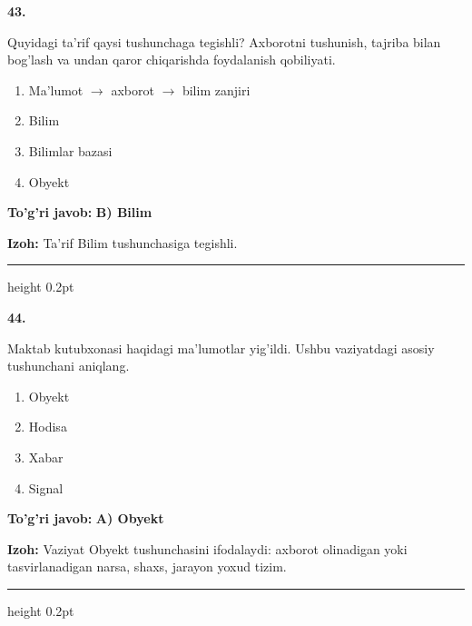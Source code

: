 \documentclass[10pt,a4paper,oneside]{article}
\begin{document}
\noindent\textbf{\color{ink}43.}
\par
Quyidagi ta'rif qaysi tushunchaga tegishli? Axborotni tushunish, tajriba bilan bog'lash va undan qaror chiqarishda foydalanish qobiliyati.
\begin{enumerate}[label=\Alph*),leftmargin=9mm]
\item Ma'lumot \ensuremath{\to} axborot \ensuremath{\to} bilim zanjiri
\item Bilim
\item Bilimlar bazasi
\item Obyekt
\end{enumerate}
\begin{tcolorbox}[enhanced,breakable,colback=teal!4,colframe=teal!50!black,boxrule=0.5pt,arc=1.1mm,left=3mm,right=3mm,top=1.7mm,bottom=1.7mm,before skip=2mm,after skip=2mm]
\textbf{\color{teal}To'g'ri javob:} \textbf{B) Bilim}
\par\smallskip
\textbf{Izoh:} Ta'rif Bilim tushunchasiga tegishli.
\end{tcolorbox}
\vspace{2mm}\hrule height 0.2pt \vspace{3mm}

\noindent\textbf{\color{ink}44.}
\par
Maktab kutubxonasi haqidagi ma'lumotlar yig'ildi. Ushbu vaziyatdagi asosiy tushunchani aniqlang.
\begin{enumerate}[label=\Alph*),leftmargin=9mm]
\item Obyekt
\item Hodisa
\item Xabar
\item Signal
\end{enumerate}
\begin{tcolorbox}[enhanced,breakable,colback=teal!4,colframe=teal!50!black,boxrule=0.5pt,arc=1.1mm,left=3mm,right=3mm,top=1.7mm,bottom=1.7mm,before skip=2mm,after skip=2mm]
\textbf{\color{teal}To'g'ri javob:} \textbf{A) Obyekt}
\par\smallskip
\textbf{Izoh:} Vaziyat Obyekt tushunchasini ifodalaydi: axborot olinadigan yoki tasvirlanadigan narsa, shaxs, jarayon yoxud tizim.
\end{tcolorbox}
\vspace{2mm}\hrule height 0.2pt \vspace{3mm}
\end{document}
